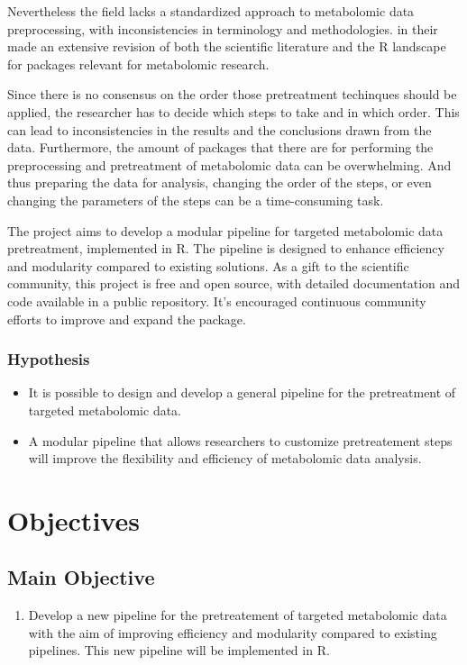 \documentclass[ENG, BIB]{TFUOC}%
\begin{document}
Nevertheless the field lacks a standardized approach to metabolomic data preprocessing, with inconsistencies in terminology and methodologies.
\citeauthor{stanstrupMetaRbolomicsToolboxBioconductor2019} in their  made an extensive revision of both the scientific literature and the R landscape for packages relevant for metabolomic research.

Since there is no consensus on the order those pretreatment techinques should be applied, the researcher has to decide which steps to take and in which order. This can lead to inconsistencies in the results and the conclusions drawn from the data. Furthermore, the amount of packages that there are for performing the preprocessing and pretreatment of metabolomic data can be overwhelming. And thus preparing the data for analysis, changing the order of the steps, or even changing the parameters of the steps can be a time-consuming task.

The project aims to develop a modular pipeline for targeted metabolomic data pretreatment, implemented in R. The pipeline is designed to enhance efficiency and modularity compared to existing solutions. As a gift to the scientific community, this project is free and open source, with detailed documentation and code available in a public repository. It's encouraged continuous community efforts to improve and expand the package.


\subsection{Hypothesis}


\begin{itemize}
    \item It is possible to design and develop a general pipeline for the pretreatment of targeted metabolomic data.
    \item A modular pipeline that allows researchers to customize pretreatement steps will improve the flexibility and efficiency of metabolomic data analysis.
\end{itemize}

\chapter{Objectives}

\section{Main Objective}
\begin{enumerate}
    \item Develop a new pipeline for the pretreatement of targeted metabolomic data with the aim of improving efficiency and modularity compared to existing pipelines. This new pipeline will be implemented in R.
\end{enumerate}
\end{document}
